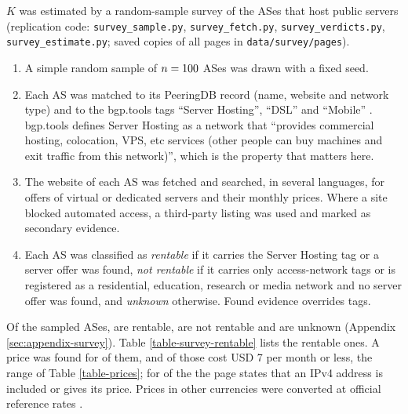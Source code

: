\documentclass[english]{mrl}
\theoremstyle{plain}
\begin{document}
$K$ was estimated by a random-sample survey of the \svFrame{} ASes that host public servers (replication code: \texttt{survey\_sample.py}, \texttt{survey\_fetch.py}, \texttt{survey\_verdicts.py}, \texttt{survey\_estimate.py}; saved copies of all pages in \texttt{data/survey/pages}).
\begin{enumerate}
\item A simple random sample of $n=100$ ASes was drawn with a fixed seed.
\item Each AS was matched to its PeeringDB record (name, website and network type) \cite{PeeringDB} and to the bgp.tools tags ``Server Hosting'', ``DSL'' and ``Mobile'' \cite{BgpToolsTags}. bgp.tools defines Server Hosting as a network that ``provides commercial hosting, colocation, VPS, etc services (other people can buy machines and exit traffic from this network)'', which is the property that matters here.
\item The website of each AS was fetched and searched, in several languages, for offers of virtual or dedicated servers and their monthly prices. Where a site blocked automated access, a third-party listing was used and marked as secondary evidence.
\item Each AS was classified as \emph{rentable} if it carries the Server Hosting tag or a server offer was found, \emph{not rentable} if it carries only access-network tags or is registered as a residential, education, research or media network and no server offer was found, and \emph{unknown} otherwise. Found evidence overrides tags.
\end{enumerate}

Of the \svn{} sampled ASes, \svR{} are rentable, \svN{} are not rentable and \svU{} are unknown (Appendix \ref{sec:appendix-survey}). Table \ref{table-survey-rentable} lists the rentable ones. A price was found for \svPriced{} of them, and \svCheap{} of those cost USD 7 per month or less, the range of Table \ref{table-prices}; for \svCheapV{} of the \svCheap{} the page states that an IPv4 address is included or gives its price. Prices in other currencies were converted at official reference rates \cite{FXRates,ECB20261005}.


\end{document}
